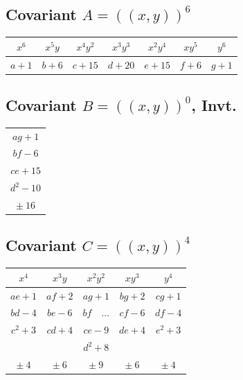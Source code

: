\documentclass[11pt,a4paper]{book}
\begin{document}
\newpage

\subsection*{Covariant $A = (\!\!(x,y)\!\!)^{6}$}

\begin{center}
\begin{tabular}{|c|c|c|c|c|c|c|}
\hline
$x^{6}$ & $x^{5}y$ & $x^{4}y^{2}$ & $x^{3}y^{3}$ & $x^{2}y^{4}$ & $xy^{5}$ & $y^{6}$ \\
\hline
$a+1$ & $b+6$ & $c+15$ & $d+20$ & $e+15$ & $f+6$ & $g+1$ \\
\hline
\end{tabular}
\end{center}

\subsection*{Covariant $B = (\!\!(x,y)\!\!)^{0}$, Invt.}

\begin{center}
\begin{tabular}{|c|}
\hline
$ag+1$ \\
$bf-6$ \\
$ce+15$ \\
$d^{2}-10$ \\
\hline
$\pm\ 16$ \\
\hline
\end{tabular}
\end{center}

\subsection*{Covariant $C = (\!\!(x,y)\!\!)^{4}$}

\begin{center}
\begin{tabular}{|c|c|c|c|c|}
\hline
$x^{4}$ & $x^{3}y$ & $x^{2}y^{2}$ & $xy^{3}$ & $y^{4}$ \\
\hline
$ae+1$ & $af+2$ & $ag+1$ & $bg+2$ & $cg+1$ \\
$bd-4$ & $be-6$ & $bf\quad\dots$ & $cf-6$ & $df-4$ \\
$c^{2}+3$ & $cd+4$ & $ce-9$ & $de+4$ & $e^{2}+3$ \\
 &  & $d^{2}+8$ &  &  \\
\hline
$\pm\ 4$ & $\pm\ 6$ & $\pm\ 9$ & $\pm\ 6$ & $\pm\ 4$ \\
\hline
\end{tabular}
\end{center}
\end{document}
